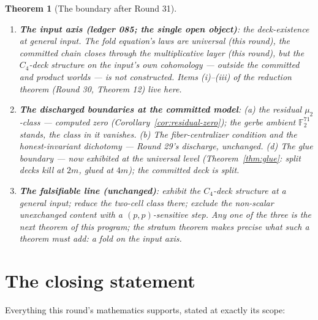\documentclass[11pt]{article}
\newcommand{\F}{\mathbb F}
\newtheorem{theorem}{Theorem}[section]
\begin{document}
\begin{theorem}[The boundary after Round 31]\label{thm:boundary}
\leavevmode
\begin{enumerate}
\item \textbf{The input axis (ledger 085; the single open object)}:
the deck-existence at general input. The fold equation's laws are
universal (this round), the committed chain closes through the
multiplicative layer (this round), but the $C_4$-deck structure on
the input's own cohomology --- outside the committed and product
worlds --- is not constructed. Items (i)--(iii) of the reduction
theorem (Round 30, Theorem 12) live here.
\item \textbf{The discharged boundaries at the committed model}:
(a) the residual $\mu_2$-class --- computed zero
(Corollary~\ref{cor:residual-zero}); the gerbe ambient
$\F_2^{71}$ stands, the class in it vanishes. (b) The
fiber-centralizer condition and the honest-invariant dichotomy ---
Round 29's discharge, unchanged. (d) The glue boundary --- now
exhibited at the universal level (Theorem~\ref{thm:glue}: split
decks kill at $2m$, glued at $4m$); the committed deck is split.
\item \textbf{The falsifiable line (unchanged)}: exhibit the
$C_4$-deck structure at a general input; reduce the two-cell class
there; exclude the non-scalar unexchanged content with a
$(p,p)$-sensitive step. Any one of the three is the next theorem of
this program; the stratum theorem makes precise what such a theorem
must add: a fold on the input axis.
\end{enumerate}
\end{theorem}

\section*{The closing statement}

Everything this round's mathematics supports, stated at exactly its
scope:
\end{document}
